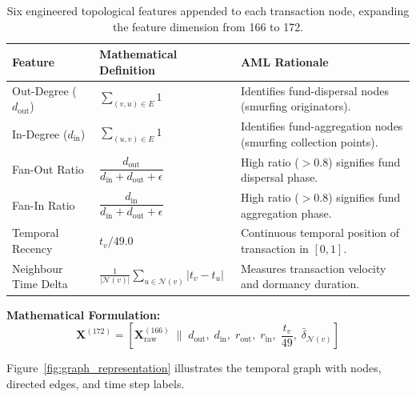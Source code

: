 \begin{table}[!htbp]
\centering
\caption[Engineered Topological Features]{Six engineered topological features appended to each transaction node, expanding the feature dimension from 166 to 172.}
\label{tab:engineered_features}
\begin{tabularx}{\textwidth}{>{\hsize}L >{\hsize}L >{\hsize}L}
\toprule
\textbf{Feature} & \textbf{Mathematical Definition} & \textbf{AML Rationale} \\
\midrule
Out-Degree ($d_{\text{out}}$) & $\sum_{(v, u) \in E} 1$ & Identifies fund-dispersal nodes (smurfing originators). \\
In-Degree ($d_{\text{in}}$) & $\sum_{(u, v) \in E} 1$ & Identifies fund-aggregation nodes (smurfing collection points). \\
Fan-Out Ratio & $\dfrac{d_{\text{out}}}{d_{\text{in}} + d_{\text{out}} + \epsilon}$ & High ratio ($> 0.8$) signifies fund dispersal phase. \\
Fan-In Ratio & $\dfrac{d_{\text{in}}}{d_{\text{in}} + d_{\text{out}} + \epsilon}$ & High ratio ($> 0.8$) signifies fund aggregation phase. \\
Temporal Recency & $t_v / 49.0$ & Continuous temporal position of transaction in $[0, 1]$. \\
Neighbour Time Delta & $\frac{1}{|\mathcal{N}(v)|} \sum_{u \in \mathcal{N}(v)} |t_v - t_u|$ & Measures transaction velocity and dormancy duration. \\
\bottomrule
\end{tabularx}
\end{table}

\noindent \textbf{Mathematical Formulation:}
\begin{equation}
\mathbf{X}^{(172)} = \left[ \mathbf{X}^{(166)}_{\text{raw}} \;\big\|\; d_{\text{out}}, \; d_{\text{in}}, \; r_{\text{out}}, \; r_{\text{in}}, \; \frac{t_v}{49}, \; \bar{\delta}_{\mathcal{N}(v)} \right]
\label{eq:feature_expansion}
\end{equation}

Figure~\ref{fig:graph_representation} illustrates the temporal graph with nodes, directed edges, and time step labels.

